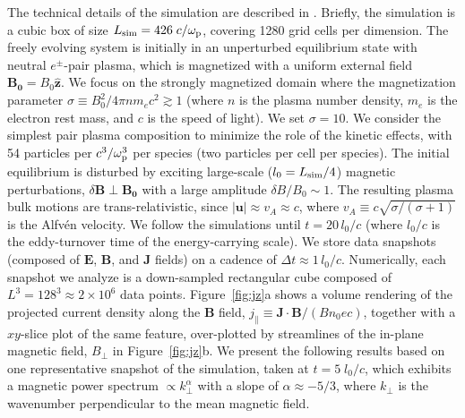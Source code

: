 The technical details of the simulation are described in \citet{nattila_radiative_2021}.
Briefly, the simulation is a cubic box of size $L_{\rm sim} = 426\;c/\omega_{\rm p}$, covering 1280 grid cells per dimension.
The freely evolving system is initially in an unperturbed equilibrium state with neutral $e^\pm$-pair plasma, which is magnetized with a uniform external field $\mathbf{B_0} = B_0 \hat{\mathbf{z}}$.
We focus on the strongly magnetized domain where the magnetization parameter $\sigma \equiv B_0^2/4\pi n m_e c^2 \gtrsim 1$ (where $n$ is the plasma number density, $m_e$ is the electron rest mass, and $c$ is the speed of light).
We set $\sigma=10$.
We consider the simplest pair plasma composition to minimize the role of the kinetic effects, with 54 particles per $c^3/\omega_{\rm p}^3$ per species (two particles per cell per species).
The initial equilibrium is disturbed by exciting large-scale ($l_0 = L_{\rm sim}/4$) magnetic perturbations, $\delta \mathbf{B} \perp \mathbf{B_0}$ with a large amplitude $\delta B/B_0 \sim 1$.
The resulting plasma bulk motions are trans-relativistic, since $|\mathbf{u}| \approx v_A \approx c$, where $v_A \equiv c \sqrt{\sigma/(\sigma+1)}$ is the Alfv\'en velocity.
We follow the simulations until $t = 20\, l_{0}/c$ (where $l_0/c$ is the eddy-turnover time of the energy-carrying scale).
We store data snapshots (composed of $\mathbf{E}$, $\mathbf{B}$, and $\mathbf{J}$ fields) on a cadence of $\Delta t \approx 1 \, l_0/c$.
Numerically, each snapshot we analyze is a down-sampled rectangular cube composed of $L^3 = 128^{3} \approx 2 \times 10^6$ data points.
Figure~\ref{fig:jz}a shows a volume rendering of the projected current density along the $\mathbf{B}$ field, $j_{\parallel} \equiv \mathbf{J}\cdot\mathbf{B}/(Bn_0ec)$, together with a $xy$-slice plot of the same feature, over-plotted by streamlines of the in-plane magnetic field, $B_{\perp}$ in Figure~\ref{fig:jz}b.
We present the following results based on one representative snapshot of the simulation, taken at $t = 5\;l_0/c$, which exhibits a magnetic power spectrum  $\propto k_\perp^\alpha$ with a slope of $\alpha \approx -5/3$, where $k_\perp$ is the wavenumber perpendicular to the mean magnetic field.

